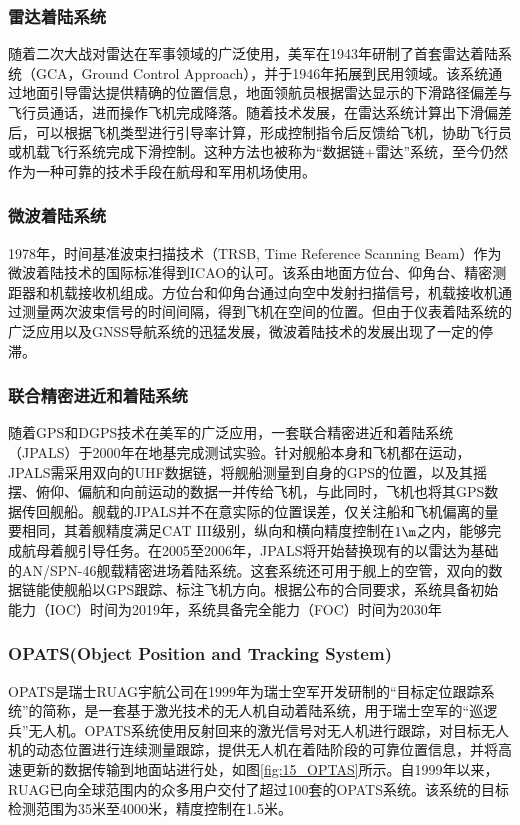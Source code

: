 \subsubsection{雷达着陆系统}
随着二次大战对雷达在军事领域的广泛使用，美军在1943年研制了首套雷达着陆系统（GCA，Ground Control Approach），并于1946年拓展到民用领域。该系统通过地面引导雷达提供精确的位置信息，地面领航员根据雷达显示的下滑路径偏差与飞行员通话，进而操作飞机完成降落。随着技术发展，在雷达系统计算出下滑偏差后，可以根据飞机类型进行引导率计算，形成控制指令后反馈给飞机，协助飞行员或机载飞行系统完成下滑控制。这种方法也被称为“数据链+雷达”系统，至今仍然作为一种可靠的技术手段在航母和军用机场使用。

\subsubsection{微波着陆系统}
1978年，时间基准波束扫描技术（TRSB, Time Reference Scanning Beam）作为微波着陆技术的国际标准得到ICAO的认可。该系由地面方位台、仰角台、精密测距器和机载接收机组成。方位台和仰角台通过向空中发射扫描信号，机载接收机通过测量两次波束信号的时间间隔，得到飞机在空间的位置。但由于仪表着陆系统的广泛应用以及GNSS导航系统的迅猛发展，微波着陆技术的发展出现了一定的停滞。

\subsubsection{联合精密进近和着陆系统}
随着GPS和DGPS技术在美军的广泛应用，一套联合精密进近和着陆系统（JPALS）于2000年在地基完成测试实验。针对舰船本身和飞机都在运动，JPALS需采用双向的UHF数据链，将舰船测量到自身的GPS的位置，以及其摇摆、俯仰、偏航和向前运动的数据一并传给飞机，与此同时，飞机也将其GPS数据传回舰船。舰载的JPALS并不在意实际的位置误差，仅关注船和飞机偏离的量要相同，其着舰精度满足CAT III级别，纵向和横向精度控制在$1 \m$之内，能够完成航母着舰引导任务。在2005至2006年，JPALS将开始替换现有的以雷达为基础的AN/SPN-46舰载精密进场着陆系统。这套系统还可用于舰上的空管，双向的数据链能使舰船以GPS跟踪、标注飞机方向。根据公布的合同要求，系统具备初始能力（IOC）时间为2019年，系统具备完全能力（FOC）时间为2030年


\subsubsection{OPATS(Object Position and Tracking System)}
OPATS是瑞士RUAG宇航公司在1999年为瑞士空军开发研制的“目标定位跟踪系统”的简称，是一套基于激光技术的无人机自动着陆系统，用于瑞士空军的“巡逻兵”无人机。OPATS系统使用反射回来的激光信号对无人机进行跟踪，对目标无人机的动态位置进行连续测量跟踪，提供无人机在着陆阶段的可靠位置信息，并将高速更新的数据传输到地面站进行处，如图\ref{fig:15_OPTAS}所示。自1999年以来，RUAG已向全球范围内的众多用户交付了超过100套的OPATS系统。该系统的目标检测范围为35米至4000米，精度控制在1.5米。

